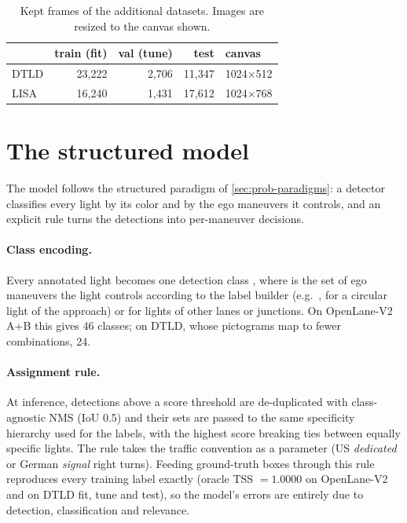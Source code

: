 \begin{table}[t]
\centering
\caption{Kept frames of the additional datasets. Images are resized to the canvas shown.}
\label{tab:ext-splits}
\begin{tabular}{@{}lrrrl@{}}
\toprule
 & train (fit) & val (tune) & test & canvas \\
\midrule
DTLD & 23,222 & 2,706 & 11,347 & 1024$\times$512 \\
LISA & 16,240 & 1,431 & 17,612 & 1024$\times$768 \\
\bottomrule
\end{tabular}
\end{table}

\section{The structured model}
\label{sec:method-rfdetr}

The model follows the structured paradigm of \cref{sec:prob-paradigms}: a detector classifies every
light by its color and by the ego maneuvers it controls, and an explicit rule turns the detections into
per-maneuver decisions.

\paragraph{Class encoding.} Every annotated light becomes one detection class ,
where  is the set of ego maneuvers the light controls according to the label builder
(e.g.\ ,  for a circular light of the approach) or 
for lights of other lanes or junctions. On OpenLane-V2 A+B this gives 46 classes; on DTLD, whose
pictograms map to fewer combinations, 24.

\paragraph{Assignment rule.} At inference, detections above a score threshold are de-duplicated with
class-agnostic NMS (IoU 0.5) and their  sets are passed to the same specificity hierarchy
used for the labels, with the highest score breaking ties between equally specific lights. The rule
takes the traffic convention as a parameter (US \emph{dedicated} or German \emph{signal} right turns).
Feeding ground-truth boxes through this rule reproduces every training label exactly (oracle TSS
$=1.0000$ on OpenLane-V2 and on DTLD fit, tune and test), so the model's errors are entirely due to
detection, classification and relevance.

